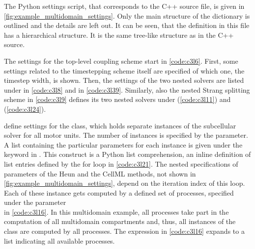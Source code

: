 The Python settings script, that corresponds to the C++ source file, is given in \cref{fig:example_multidomain_settings}. Only the main structure of the  dictionary is outlined and the details are left out. It can be seen, that the definition in this file has a hierarchical structure. It is the same tree-like structure as in the C++ source.

The settings for the top-level coupling scheme start in \cref{code:c3l6}. First, some settings related to the timestepping scheme itself are specified of which one, the timestep width, is shown. Then, the settings of the two nested solvers are listed under  in \cref{code:c3l8} and  in \cref{code:c3l39}. Similarly, also the nested Strang splitting scheme in \cref{code:c3l9} defines its two nested solvers under  (\cref{code:c3l11}) and  (\cref{code:c3l24}).

 define settings for the  class, which holds separate instances of the subcellular solver for all motor units.
The number of instances is specified by the  parameter. A list containing the particular parameters for each instance is given under the keyword  in . This construct is a Python list comprehension, an inline definition of list entries defined by the for loop in \cref{code:c3l21}. The nested specifications of parameters of the Heun and the CellML methods, not shown in \cref{fig:example_multidomain_settings}, depend on the iteration index  of this loop. 
Each of these instance gets computed by a defined set of processes, specified under the parameter \\ in \cref{code:c3l16}. In this multidomain example, all processes take part in the computation of all multidomain compartments and, thus, all instances of the  class are computed by all processes. The expression in \cref{code:c3l16} expands to a list \code{[0,1,2,...]} indicating all available processes.

